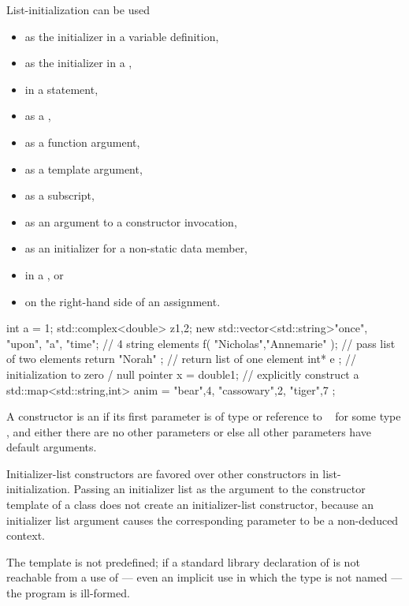 \begin{note}
List-initialization can be used
\begin{itemize}
\item as the initializer in a variable definition,
\item as the initializer in a ,
\item in a  statement,
\item as a ,
\item as a function argument,
\item as a template argument,
\item as a subscript,
\item as an argument to a constructor invocation,
\item as an initializer for a non-static data member,
\item in a , or
\item on the right-hand side of an assignment.
\end{itemize}

\begin{example}
\begin{codeblock}
int a = {1};
std::complex<double> z{1,2};
new std::vector<std::string>{"once", "upon", "a", "time"};  // 4 string elements
f( {"Nicholas","Annemarie"} );  // pass list of two elements
return { "Norah" };             // return list of one element
int* e {};                      // initialization to zero / null pointer
x = double{1};                  // explicitly construct a 
std::map<std::string,int> anim = { {"bear",4}, {"cassowary",2}, {"tiger",7} };
\end{codeblock}
\end{example}
\end{note}

\pnum
A constructor is an  if its first parameter is
of type  or reference to
\cv{}~ for some type , and either there are no other
parameters or else all other parameters have default arguments.
\begin{note}
Initializer-list constructors are favored over other constructors in
list-initialization. Passing an initializer list as the argument
to the constructor template  of a class  does not
create an initializer-list constructor, because an initializer list argument causes the
corresponding parameter to be a non-deduced context.
\end{note}
The template
 is not predefined;
if a standard library declaration
of  is not reachable from
a use of  ---
even an implicit use in which the type is not named ---
the program is ill-formed.

